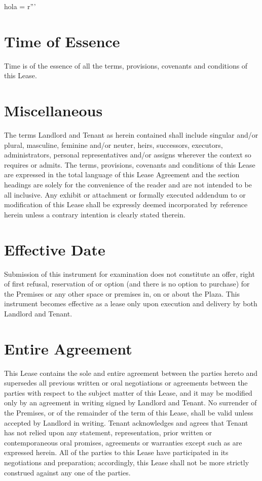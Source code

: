 hola = r'''\documentclass{article}
\begin{document}
\section{Time of Essence}
    Time is of the essence of all the terms, provisions, covenants and conditions of this Lease.

\section{Miscellaneous}
    The terms Landlord and Tenant as herein contained shall include singular and/or plural, masculine, feminine and/or neuter, heirs, successors, executors, administrators, personal representatives and/or assigns wherever the context so requires or admits. The terms, provisions, covenants and conditions of this Lease are expressed in the total language of this Lease Agreement and the section headings are solely for the convenience of the reader and are not intended to be all inclusive. Any exhibit or attachment or formally executed addendum to or modification of this Lease shall be expressly deemed incorporated by reference herein unless a contrary intention is clearly stated therein.

\section{Effective Date}
    Submission of this instrument for examination does not constitute an offer, right of first refusal, reservation of or option (and there is no option to purchase) for the Premises or any other space or premises in, on or about the Plaza. This instrument becomes effective as a lease only upon execution and delivery by both Landlord and Tenant.

\section{Entire Agreement}
    This Lease contains the sole and entire agreement between the parties hereto and supersedes all previous written or oral negotiations or agreements between the parties with respect to the subject matter of this Lease, and it may be modified only by an agreement in writing signed by Landlord and Tenant. No surrender of the Premises, or of the remainder of the term of this Lease, shall be valid unless accepted by Landlord in writing. Tenant acknowledges and agrees that Tenant has not relied upon any statement, representation, prior written or contemporaneous oral promises, agreements or warranties except such as are expressed herein.  All of the parties to this Lease have participated in its negotiations and preparation; accordingly, this Lease shall not be more strictly construed against any one of the parties.
\end{document}
